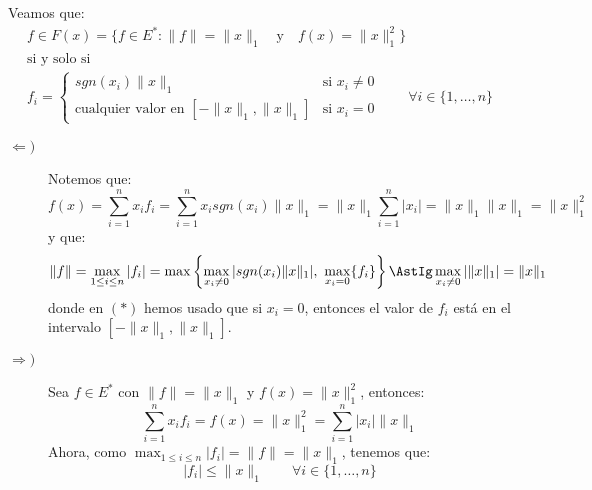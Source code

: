 \begin{ejercicio}
\begin{enumerate}[label=\alph*)]
\begin{enumerate}
                    Veamos que:
                    \begin{gather*}
                        f\in F(x) = \{f\in E^\ast : \|f\| = \|x\|_1 \quad \text{y}\quad f(x) = \|x\|_1^2\} \\
                        \text{si y solo si} \\
                        f_i = \left\{\begin{array}{cl}
                            sgn(x_i)\|x\|_1 & \text{si\ } x_i\neq 0  \\
                            \text{cualquier valor en } [-\|x\|_1, \|x\|_1]& \text{si\ } x_i=0 
                        \end{array}\right. \qquad \forall i \in \{1,\ldots,n\}
                    \end{gather*}
                    \begin{description}
                        \item [$\Longleftarrow )$] Notemos que:
                            \begin{equation*}
                                f(x) = \sum_{i=1}^{n}x_if_i = \sum_{i=1}^{n} x_isgn(x_i)\|x\|_1 = \|x\|_1 \sum_{i=1}^{n} |x_i| = \|x\|_1 \|x\|_1 = \|x\|_1^2
                            \end{equation*}
                            y que:
                            \begin{equation*}
                                \|f\| = \max_{1\leq i\leq n}|f_i| = \max\left\{\max_{x_i\neq 0} |sgn(x_i)\|x\|_1|,~\max_{x_i = 0}\{f_i\} \right\} \AstIg \max_{x_i\neq 0} |\|x\|_1| = \|x\|_1
                            \end{equation*}
                            donde en $(\ast)$ hemos usado que si $x_i=0$, entonces el valor de $f_i$ está en el intervalo $[-\|x\|_1, \|x\|_1]$.
                        \item [$\Longrightarrow )$] Sea $f\in E^\ast$ con $\|f\| = \|x\|_1$ y $f(x) = \|x\|_1^2$, entonces:
                            \begin{equation*}
                                \sum_{i=1}^{n}x_if_i = f(x) = \|x\|_1^2 = \sum_{i=1}^{n} |x_i| \|x\|_1
                            \end{equation*}
                            Ahora, como $\max_{1\leq i\leq n}|f_i| = \|f\| = \|x\|_1$, tenemos que:
                            \begin{equation*}
                                |f_i| \leq \|x\|_1 \qquad \forall i \in \{1,\ldots,n\}

\end{equation*}
\end{description}
\end{enumerate}
\end{enumerate}
\end{ejercicio}
